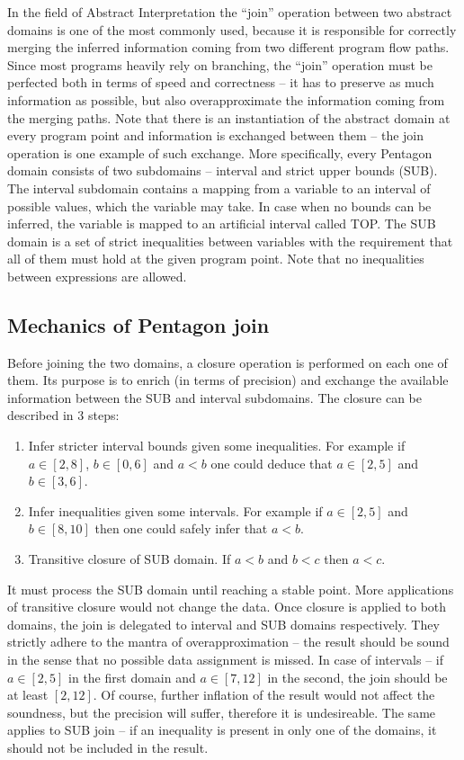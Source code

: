 \documentclass[letterpaper]{article}
\begin{document}
In the field of Abstract Interpretation the ``join'' operation between two abstract 
domains is one of the most commonly used, because it is responsible for correctly 
merging the inferred information coming from two different program flow paths. 
Since most programs heavily rely on branching, the ``join'' operation must be perfected 
both in terms of speed and correctness -- it has to preserve as much information as possible, 
but also overapproximate the information coming from the merging paths. 
Note that there is an instantiation of the abstract domain at every program point 
and information is exchanged between them -- the join operation is one example of 
such exchange. More specifically, every Pentagon domain \cite{Logozzo2008} consists of two 
subdomains -- interval and strict upper bounds (SUB). The interval subdomain 
contains a mapping from a variable to an interval of possible values, which 
the variable may take. In case when no bounds can be inferred, the variable 
is mapped to an artificial interval called TOP. The SUB domain is a set of 
strict inequalities between variables with the requirement that all of them 
must hold at the given program point. Note that no inequalities between expressions are allowed.

\subsection{Mechanics of Pentagon join}
Before joining the two domains, a closure operation is performed on each one of them. 
Its purpose is to enrich (in terms of precision) and exchange the available 
information between the SUB and interval subdomains. The closure can be described in 3 steps:
\begin{enumerate}
\item Infer stricter interval bounds given some inequalities. 
For example if \(a \in [2,8]\), \(b \in [0,6]\) and \(a < b\) one could deduce that \(a \in [2,5]\) and \(b \in [3,6]\).
\item Infer inequalities given some intervals. 
For example if \(a \in [2,5]\) and \(b \in [8,10]\) then one could safely infer that \(a < b\).
\item Transitive closure of SUB domain. If \(a < b\) and \(b < c\) then \(a < c\).
\end{enumerate}
It must process the SUB domain until reaching a stable point. More applications of transitive closure would not change the data.
Once closure is applied to both domains, the join is delegated to interval and SUB domains respectively. 
They strictly adhere to the mantra of overapproximation -- the result should be sound in the 
sense that no possible data assignment is missed. In case of intervals -- if \(a \in [2,5]\) in 
the first domain and \(a \in [7,12]\) in the second, the join should be at least \([2,12]\). 
Of course, further inflation of the result would not affect the soundness, but 
the precision will suffer, therefore it is undesireable. 
The same applies to SUB join -- if an inequality is present in only one of the domains, it should not be included in the result.
\end{document}
